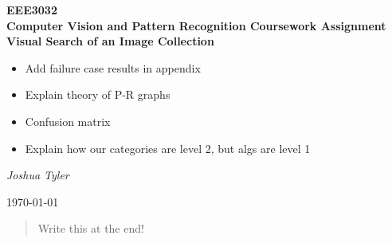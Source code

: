 




	
\hypersetup{pageanchor=false} %

	
\begin{titlepage}
	\centering
	{\huge\bfseries EEE3032 \\ Computer Vision and Pattern Recognition Coursework Assignment \\ Visual Search of an Image Collection \par}
	\vspace{1cm}
	
	\huge
	\begin{itemize}
		\item Add failure case results in appendix
		\item Explain theory of P-R graphs
		\item Confusion matrix
		\item Explain how our categories are level 2, but algs are level 1
	\end{itemize}

	\vspace{2.5cm}
	{\Large\itshape Joshua Tyler \par}
	\vfill
	
	
	{\large \today\par}
\end{titlepage}

\clearpage
\begingroup
\let\titlepage\relax
\let\vfil\relax
\let\endtitlepage\relax
\let\clearpage\relax

\begin{abstract}
	Write this at the end!
\end{abstract}

\vspace{50pt}
\tableofcontents
\endgroup

\clearpage %

\hypersetup{pageanchor=true}



\clearpage







          
